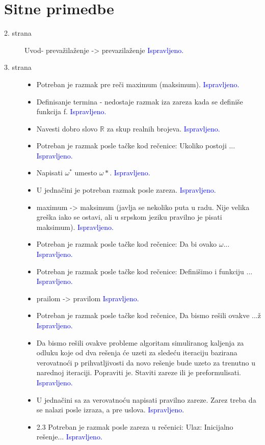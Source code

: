 \documentclass[a4paper]{report}
\newcommand{\odgovor}[1]{\textcolor{blue}{#1}}
\begin{document}
\section{Sitne primedbe}
\begin{description}

\item [2. strana] Uvod- prevažilaženje -> prevazilaženje
\odgovor {Ispravljeno.}

\item [3. strana] 

\begin{itemize}
\item Potreban je razmak pre reči maximum (maksimum).
\odgovor {Ispravljeno.}
\item Definisanje termina  - nedostaje razmak iza zareza kada se definiše funkcija f.
\odgovor {Ispravljeno.}
\item Navesti dobro slovo $\mathbb{R}$  za skup realnih brojeva.
\odgovor {Ispravljeno.}
\item Potreban je razmak posle tačke kod rečenice: Ukoliko postoji ...
\odgovor {Ispravljeno.}
\item Napisati $\omega^*$ umesto $\omega*$.
\odgovor {Ispravljeno.}
\item U jednačini je potreban razmak posle zareza.
\odgovor {Ispravljeno.}
\item maximum -> maksimum (javlja se nekoliko puta u radu. Nije velika greška iako se ostavi, ali u srpskom jeziku pravilno je pisati maksimum).
\odgovor {Ispravljeno.}
\item Potreban je razmak posle tačke kod rečenice: Da bi ovako $\omega$...
\odgovor {Ispravljeno.}
\item Potreban je razmak posle tačke kod rečenice: Definišimo i funkciju ...
\odgovor {Ispravljeno.}
\item prailom -> pravilom
\odgovor {Ispravljeno.}
\item Potreban je razmak posle tačke kod rečenice, Da bismo rešili ovakve ...ž
\odgovor {Ispravljeno.}
\item  Da bismo rešili ovakve probleme algoritam simuliranog kaljenja za odluku koje od dva rešenja  će uzeti za sledeću iteraciju bazirana verovatnoći p prihvatljivosti da novo rešenje bude uzeto za trenutno u narednoj iteraciji. Popraviti je. Staviti zareze ili je preformulisati.
\odgovor {Ispravljeno.}
\item U jednačini sa za verovatnoću napisati pravilno zareze. Zarez treba da se nalazi posle izraza, a pre uslova.
\odgovor {Ispravljeno.}
\item 2.3 Potreban je razmak posle zareza u rečenici: Ulaz: Inicijalno rešenje...
\odgovor {Ispravljeno.}
\end{itemize}


\end{description}
\end{document}
